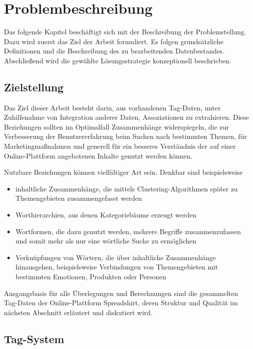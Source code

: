 \chapter{Problembeschreibung}

Das folgende Kapitel beschäftigt sich mit der Beschreibung der Problemstellung. Dazu wird zuerst das Ziel der Arbeit formuliert. Es folgen grundsätzliche Definitionen und die Beschreibung des zu bearbeitenden Datenbestandes. Abschließend wird die gewählte Lösungsstrategie konzeptionell beschrieben.

\section{Zielstellung}

Das Ziel dieser Arbeit besteht darin, aus vorhandenen Tag-Daten, unter Zuhilfenahme von Integration anderer Daten, Assoziationen zu extrahieren. Diese Beziehungen sollten im Optimalfall Zusammenhänge widerspiegeln, die zur Verbesserung der Benutzererfahrung beim Suchen nach bestimmten Themen, für Marketingmaßnahmen und generell für ein besseres Verständnis der auf einer Online-Plattform angebotenen Inhalte genutzt werden können.

Nutzbare Beziehungen können vielfältiger Art sein. Denkbar sind beispielsweise

\begin{itemize}
    \item inhaltliche Zusammenhänge, die mittels Clustering-Algorithmen später zu Themengebieten zusammengefasst werden
    \item Worthierarchien, aus denen Kategoriebäume erzeugt werden
    \item Wortformen, die dazu genutzt werden, mehrere Begriffe zusammenzufassen und somit mehr als nur eine wörtliche Suche zu ermöglichen
    \item Verknüpfungen von Wörtern, die über inhaltliche Zusammenhänge hinausgehen, beispielsweise Verbindungen von Themengebieten mit bestimmten Emotionen, Produkten oder Personen
\end{itemize}

Ausgangsbasis für alle Überlegungen und Berechnungen sind die gesammelten Tag-Daten der Online-Plattform Spreadshirt, deren Struktur und Qualität im nächsten Abschnitt erläutert und diskutiert wird.

\section{Tag-System}
\label{data}


